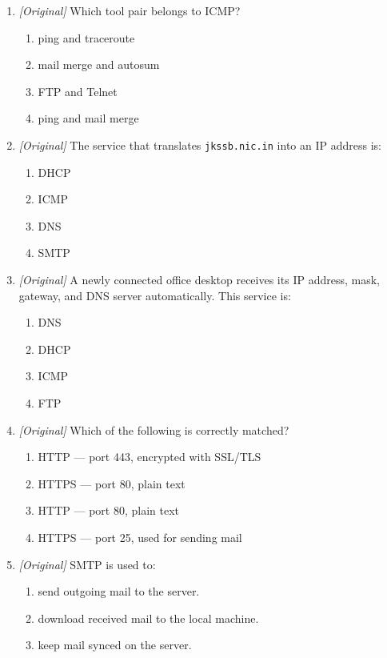 \documentclass[11pt]{article}
\begin{document}
\begin{enumerate}[label=\textbf{Q\arabic*.}, leftmargin=*]
\begin{enumerate}[label=\Alph*.]
  \end{enumerate}
\item \textit{[Original]} Which tool pair belongs to ICMP?
  \begin{enumerate}[label=\Alph*.]
    \item ping and traceroute
    \item mail merge and autosum
    \item FTP and Telnet
    \item ping and mail merge
  \end{enumerate}
\item \textit{[Original]} The service that translates
  \texttt{jkssb.nic.in} into an IP address is:
  \begin{enumerate}[label=\Alph*.]
    \item DHCP
    \item ICMP
    \item DNS
    \item SMTP
  \end{enumerate}
\item \textit{[Original]} A newly connected office desktop receives its IP
  address, mask, gateway, and DNS server automatically. This service is:
  \begin{enumerate}[label=\Alph*.]
    \item DNS
    \item DHCP
    \item ICMP
    \item FTP
  \end{enumerate}
\item \textit{[Original]} Which of the following is correctly matched?
  \begin{enumerate}[label=\Alph*.]
    \item HTTP --- port 443, encrypted with SSL/TLS
    \item HTTPS --- port 80, plain text
    \item HTTP --- port 80, plain text
    \item HTTPS --- port 25, used for sending mail
  \end{enumerate}
\item \textit{[Original]} SMTP is used to:
  \begin{enumerate}[label=\Alph*.]
    \item send outgoing mail to the server.
    \item download received mail to the local machine.
    \item keep mail synced on the server.

\end{enumerate}
\end{enumerate}
\end{document}
